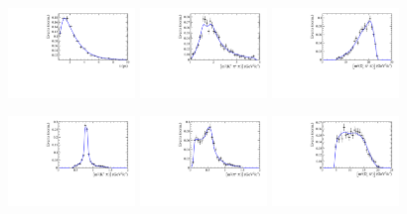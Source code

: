 \begin{figure}[h]
	\centering
		\includegraphics[width=0.3\textwidth, height = !]{figs/fullFit/signal/h_t.pdf} 
		\includegraphics[width=0.3\textwidth, height = !]{figs/fullFit/signal/s_Kpipi.pdf} 
		\includegraphics[width=0.3\textwidth, height = !]{figs/fullFit/signal/s_Dspipi.pdf} 

		\includegraphics[width=0.3\textwidth, height = !]{figs/fullFit/signal/s_Kpi.pdf} 
		\includegraphics[width=0.3\textwidth, height = !]{figs/fullFit/signal/s_pipi.pdf} 
		\includegraphics[width=0.3\textwidth, height = !]{figs/fullFit/signal/s_Dspi.pdf} 

		\caption{} 		
\end{figure}	